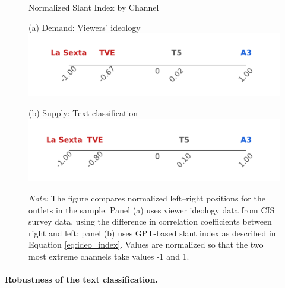 \documentclass[12pt]{article}
\begin{document}
	\begin{figure}[!htbp]
		\centering
		\caption{Normalized Slant Index by Channel}
		
		\begin{minipage}[t]{0.49\textwidth}
			\centering
			(a) Demand: Viewers' ideology
			\includegraphics[width=\linewidth]{figures/congress_line_cis}
		\end{minipage}
		\hfill
		\begin{minipage}[t]{0.49\textwidth}
			\centering
			
			
			(b) Supply: Text classification
			\includegraphics[width=\linewidth]{figures/congress_line_chatgpt}
			
			
		\end{minipage}
		
		
		\caption*{\small \textit{Note:} The figure compares normalized left–right positions for the outlets in the sample. Panel (a) uses viewer ideology data from CIS survey data, using the difference in correlation coefficients between right and left; panel (b) uses GPT-based slant index as described in Equation \eqref{eq:ideo_index}. Values are normalized so that the two most extreme channels take values -1 and 1. }
		\label{fig:channel_ideology_lines}
	\end{figure}
	
	\FloatBarrier
	
	\paragraph{Robustness of the text classification.}
	
\end{document}
